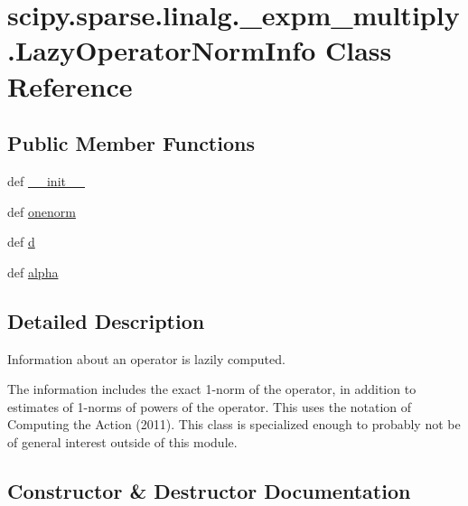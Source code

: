 \hypertarget{classscipy_1_1sparse_1_1linalg_1_1__expm__multiply_1_1LazyOperatorNormInfo}{}\section{scipy.\+sparse.\+linalg.\+\_\+expm\+\_\+multiply.\+Lazy\+Operator\+Norm\+Info Class Reference}
\label{classscipy_1_1sparse_1_1linalg_1_1__expm__multiply_1_1LazyOperatorNormInfo}
\subsection*{Public Member Functions}
\begin{DoxyCompactItemize}
\item 
def \hyperlink{classscipy_1_1sparse_1_1linalg_1_1__expm__multiply_1_1LazyOperatorNormInfo_a2e9254f85f0f2aa6b3f7d47b85b1862b}{\+\_\+\+\_\+init\+\_\+\+\_\+}
\item 
def \hyperlink{classscipy_1_1sparse_1_1linalg_1_1__expm__multiply_1_1LazyOperatorNormInfo_abac728f3600f3814d1d9702de9a24c79}{onenorm}
\item 
def \hyperlink{classscipy_1_1sparse_1_1linalg_1_1__expm__multiply_1_1LazyOperatorNormInfo_a8b0051a05b04afec699d7852128e4252}{d}
\item 
def \hyperlink{classscipy_1_1sparse_1_1linalg_1_1__expm__multiply_1_1LazyOperatorNormInfo_ab425519f7f8d2283752535638cb2398b}{alpha}
\end{DoxyCompactItemize}


\subsection{Detailed Description}
\begin{DoxyVerb}Information about an operator is lazily computed.

The information includes the exact 1-norm of the operator,
in addition to estimates of 1-norms of powers of the operator.
This uses the notation of Computing the Action (2011).
This class is specialized enough to probably not be of general interest
outside of this module.\end{DoxyVerb}
 

\subsection{Constructor \& Destructor Documentation}
\hypertarget{classscipy_1_1sparse_1_1linalg_1_1__expm__multiply_1_1LazyOperatorNormInfo_a2e9254f85f0f2aa6b3f7d47b85b1862b}{}
